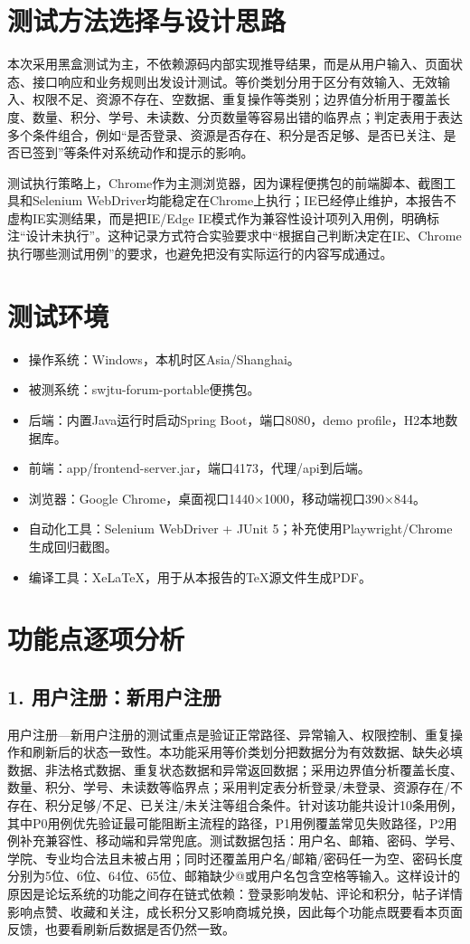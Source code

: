 \documentclass[UTF8,zihao=-4]{ctexart}
\begin{document}
\section{测试方法选择与设计思路}
本次采用黑盒测试为主，不依赖源码内部实现推导结果，而是从用户输入、页面状态、接口响应和业务规则出发设计测试。等价类划分用于区分有效输入、无效输入、权限不足、资源不存在、空数据、重复操作等类别；边界值分析用于覆盖长度、数量、积分、学号、未读数、分页数量等容易出错的临界点；判定表用于表达多个条件组合，例如“是否登录、资源是否存在、积分是否足够、是否已关注、是否已签到”等条件对系统动作和提示的影响。

测试执行策略上，Chrome作为主测浏览器，因为课程便携包的前端脚本、截图工具和Selenium WebDriver均能稳定在Chrome上执行；IE已经停止维护，本报告不虚构IE实测结果，而是把IE/Edge IE模式作为兼容性设计项列入用例，明确标注“设计未执行”。这种记录方式符合实验要求中“根据自己判断决定在IE、Chrome执行哪些测试用例”的要求，也避免把没有实际运行的内容写成通过。

\section{测试环境}
\begin{itemize}
\item 操作系统：Windows，本机时区Asia/Shanghai。
\item 被测系统：swjtu-forum-portable便携包。
\item 后端：内置Java运行时启动Spring Boot，端口8080，demo profile，H2本地数据库。
\item 前端：app/frontend-server.jar，端口4173，代理/api到后端。
\item 浏览器：Google Chrome，桌面视口1440×1000，移动端视口390×844。
\item 自动化工具：Selenium WebDriver + JUnit 5；补充使用Playwright/Chrome生成回归截图。
\item 编译工具：XeLaTeX，用于从本报告的TeX源文件生成PDF。
\end{itemize}

\section{功能点逐项分析}
\subsection{1. 用户注册：新用户注册}
用户注册—新用户注册的测试重点是验证正常路径、异常输入、权限控制、重复操作和刷新后的状态一致性。本功能采用等价类划分把数据分为有效数据、缺失必填数据、非法格式数据、重复状态数据和异常返回数据；采用边界值分析覆盖长度、数量、积分、学号、未读数等临界点；采用判定表分析登录/未登录、资源存在/不存在、积分足够/不足、已关注/未关注等组合条件。针对该功能共设计10条用例，其中P0用例优先验证最可能阻断主流程的路径，P1用例覆盖常见失败路径，P2用例补充兼容性、移动端和异常兜底。测试数据包括：用户名、邮箱、密码、学号、学院、专业均合法且未被占用；同时还覆盖用户名/邮箱/密码任一为空、密码长度分别为5位、6位、64位、65位、邮箱缺少@或用户名包含空格等输入。这样设计的原因是论坛系统的功能之间存在链式依赖：登录影响发帖、评论和积分，帖子详情影响点赞、收藏和关注，成长积分又影响商城兑换，因此每个功能点既要看本页面反馈，也要看刷新后数据是否仍然一致。
\end{document}
